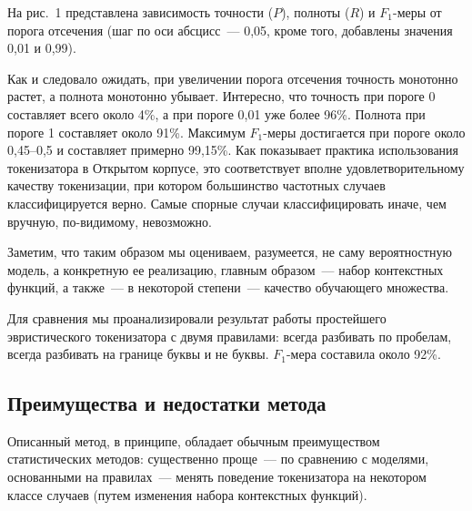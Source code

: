 \documentclass[a4paper]{article}
\begin{document}
На рис.~1 представлена зависимость точности ($P$), полноты ($R$) и $F_1$-меры от порога отсечения (шаг по оси абсцисс~--- 0,05, кроме того, добавлены значения 0,01 и 0,99).

\begin{figure}[h!]
\caption{}
\end{figure}

Как и следовало ожидать, при увеличении порога отсечения точность монотонно растет, а полнота монотонно убывает. Интересно, что точность при пороге 0 составляет всего около 4\%, а при пороге 0,01 уже более 96\%. Полнота при пороге 1 составляет около 91\%. Максимум $F_1$-меры достигается при пороге около 0,45--0,5 и составляет примерно 99,15\%. Как показывает практика использования токенизатора в Открытом корпусе, это соответствует вполне удовлетворительному качеству токенизации, при котором большинство частотных случаев классифицируется верно. Самые спорные случаи классифицировать иначе, чем вручную, по-видимому, невозможно.

Заметим, что таким образом мы оцениваем, разумеется, не саму вероятностную модель, а конкретную ее реализацию, главным образом~--- набор контекстных функций, а также~--- в некоторой степени~--- качество обучающего множества.

Для сравнения мы проанализировали результат работы простейшего эвристического токенизатора с двумя правилами: всегда разбивать по пробелам, всегда разбивать на границе буквы и не буквы. $F_1$-мера составила около 92\%.
\subsection{Преимущества и недостатки метода}
Описанный метод, в принципе, обладает обычным преимуществом статистических методов: существенно проще~--- по сравнению с моделями, основанными на правилах~--- менять поведение токенизатора на некотором классе случаев (путем изменения набора контекстных функций).
\end{document}
